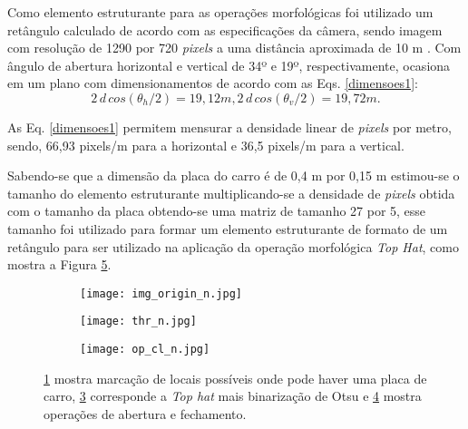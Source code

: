 Como elemento estruturante para as operações morfológicas foi utilizado um retângulo calculado de acordo com as especificações da câmera, sendo imagem com resolução de 1290 por 720 \emph{pixels} a uma distância aproximada de 10 m . Com ângulo de abertura horizontal e vertical de 34º e 19º, respectivamente, ocasiona em um plano com dimensionamentos de acordo com as Eqs. \ref{dimensoes1}:
\begin{equation}
    2\,d\,cos(\theta_{h} /2) = 19,12 m, 
    2\,d\,cos(\theta_{v} /2) = 19,72 m.
    \label{dimensoes1}
\end{equation}

As Eq. \ref{dimensoes1} permitem mensurar a densidade linear de \emph{pixels} por metro, sendo, 66,93 pixels/m para a horizontal e 36,5 pixels/m para a vertical.

Sabendo-se que a dimensão da placa do carro é de 0,4 m por 0,15 m estimou-se o tamanho do elemento estruturante multiplicando-se a densidade de \emph{pixels} obtida com o tamanho da placa obtendo-se uma matriz de tamanho 27 por 5, esse tamanho foi utilizado para formar um elemento estruturante de formato de um retângulo para ser utilizado na aplicação da operação morfológica \emph{Top Hat}, como mostra a Figura \ref{fig:three graphs}.

\begin{figure}[H]
     \centering
     
     \begin{subfigure}{0.7\textwidth}
         \texttt{[image: img\_origin\_n.jpg]}
         \caption{}
         \label{fig1:demarcada}
     \end{subfigure}

     \begin{subfigure}{0.7\textwidth}
         \texttt{[image: thr\_n.jpg]}
          \caption{}
         \label{fig2:thresh}
     \end{subfigure}

  
\end{figure}

\begin{figure}[H] \ContinuedFloat
    \centering
    \begin{subfigure}{0.7\textwidth}
         \texttt{[image: op\_cl\_n.jpg]}
          \caption{}
         \label{fig3:op_cl}
         
     \end{subfigure}
     \caption{\ref{fig1:demarcada} mostra marcação de locais possíveis onde pode haver uma placa de carro, \ref{fig2:thresh} corresponde a \emph{Top hat} mais binarização de Otsu e \ref{fig3:op_cl} mostra operações de abertura e fechamento.}
    \label{fig:three graphs}
\end{figure}




